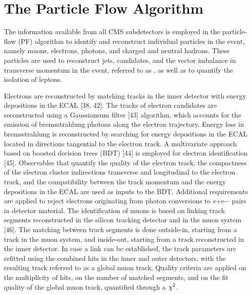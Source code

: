 \section{The Particle Flow Algorithm}


The information available from all CMS subdetectors is employed in the particle-ﬂow (PF) algorithm \cite{CMS:2009nxa,CMS:2010byl} to identify and reconstruct individual particles in the event, namely muons, electrons, photons, and charged and neutral hadrons. These particles are used to reconstruct jets, \hadtau candidates, and the vector imbalance in transverse momentum in the event, referred to as \ptvecmiss, as well as to quantify the isolation of leptons. 

Electrons are reconstructed by matching tracks in the inner detector with energy depositions in the ECAL [38, 42]. The tracks of electron candidates are reconstructed using a Gaussiansum ﬁlter [43] algorithm, which accounts for the emission of bremsstrahlung photons along the electron trajectory. Energy loss in bremsstrahlung is reconstructed by searching for energy depositions in the ECAL located in directions tangential to the electron track. A multivariate approach based on boosted decision trees (BDT) [44] is employed for electron identiﬁcation [45]. Observables that quantify the quality of the electron track, the compactness of the electron cluster indirections transverse and longitudinal to the electron track, and the compatibility between the track momentum and the energy depositions in the ECAL are used as inputs to the BDT. Additional requirements are applied to reject electrons originating from photon conversions to e+e− pairs in detector material. The identiﬁcation of muons is based on linking track segments reconstructed in the silicon tracking detector and in the muon system [46]. The matching between track segments is done outside-in, starting from a track in the muon system, and inside-out, starting from a track reconstructed in the inner detector. In case a link can be established, the track parameters are reﬁtted using the combined hits in the inner and outer detectors, with the resulting track referred to as a global muon track. Quality criteria are applied on the multiplicity of hits, on the number of matched segments, and on the ﬁt quality of the global muon track, quantiﬁed through a \ensuremath{\chisquare}.

